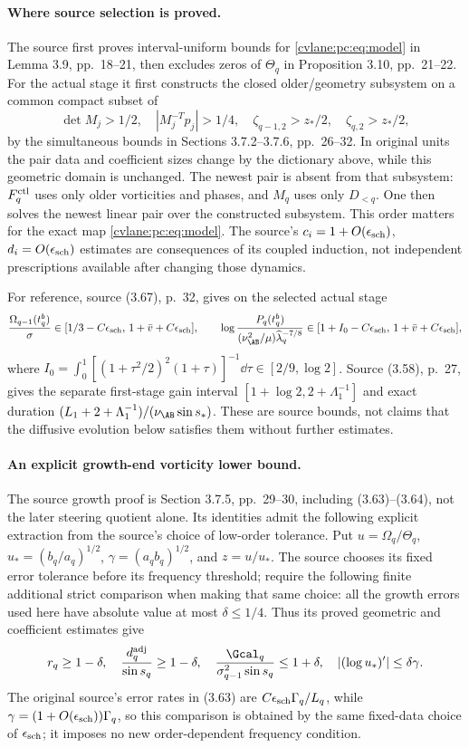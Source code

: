 \paragraph{Where source selection is proved.}
The source first proves interval-uniform bounds for \eqref{cvlane:pc:eq:model} in Lemma 3.9, pp.~18--21, then excludes zeros of $\Theta_q$ in Proposition 3.10, pp.~21--22. For the actual stage it first constructs the closed older/geometry subsystem on a common compact subset of
\[
 \det M_j>1/2,\quad |M_j^{-T}p_j|>1/4,\quad
 \zeta_{q-1,2}>z_*/2,\quad \zeta_{q,2}>z_*/2,
\]
by the simultaneous bounds in Sections 3.7.2--3.7.6, pp.~26--32. In original units the pair data and coefficient sizes change by the dictionary above, while this geometric domain is unchanged. The newest pair is absent from that subsystem: $F_q^{\rm ctl}$ uses only older vorticities and phases, and $M_q$ uses only $D_{<q}$. One then solves the newest linear pair over the constructed subsystem. This order matters for the exact map \eqref{cvlane:pc:eq:model}. The source's $c_i=1+O(\epsilon_{\rm sch})$, $d_i=O(\epsilon_{\rm sch})$ estimates are consequences of its coupled induction, not independent prescriptions available after changing those dynamics.

For reference, source (3.67), p.~32, gives on the selected actual stage
\[
 \frac{\Omega_{q-1}(t_q^b)}\sigma\in
 [1/3-C\epsilon_{\rm sch},\,1+\bar v+C\epsilon_{\rm sch}],\qquad
 \log\frac{P_q(t_q^b)}{(\nu_{\AB}^2/\mu)\widehat\lambda_q^{-7/8}}
 \in[1+I_0-C\epsilon_{\rm sch},\,1+\bar v+C\epsilon_{\rm sch}],
\]
where $I_0=\int_0^1[(1+\tau^2/2)^2(1+\tau)]^{-1}\dd\tau\in[2/9,\log2]$. Source (3.58), p.~27, gives the separate first-stage gain interval $[1+\log2,2+\Lambda_1^{-1}]$ and exact duration $(L_1+2+\Lambda_1^{-1})/(\nu_{\AB}\sin s_*)$. These are source bounds, not claims that the diffusive evolution below satisfies them without further estimates.

\paragraph{An explicit growth-end vorticity lower bound.}
The source growth proof is Section 3.7.5, pp.~29--30, including (3.63)--(3.64), not the later steering quotient alone. Its identities admit the following explicit extraction from the source's choice of low-order tolerance. Put $u=\Omega_q/\Theta_q$, $u_*=(b_q/a_q)^{1/2}$, $\gamma=(a_qb_q)^{1/2}$, and $z=u/u_*$. The source chooses its fixed error tolerance before its frequency threshold; require the following finite additional strict comparison when making that same choice: all the growth errors used here have absolute value at most $\delta\le1/4$. Thus its proved geometric and coefficient estimates give
\[
 r_q\ge1-\delta,\quad \frac{d_q^{\rm adj}}{\sin s_q}\ge1-\delta,\quad
 \frac{\Gcal_q}{\sigma_{q-1}^2\sin s_q}\le1+\delta,\quad
 |(\log u_*)'|\le\delta\gamma.
\]
The original source's error rates in (3.63) are $C\epsilon_{\rm sch}\Gamma_q/L_q$, while $\gamma=(1+O(\epsilon_{\rm sch}))\Gamma_q$, so this comparison is obtained by the same fixed-data choice of $\epsilon_{\rm sch}$; it imposes no new order-dependent frequency condition.

